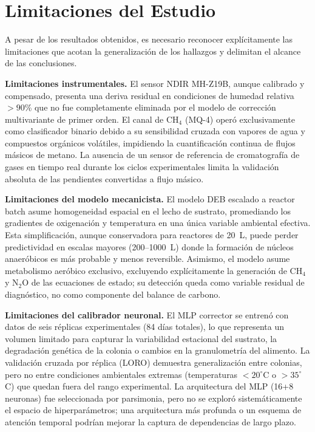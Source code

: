 \section{Limitaciones del Estudio}
\label{sec:cap6_limitaciones}

A pesar de los resultados obtenidos, es necesario reconocer explícitamente las limitaciones que acotan la generalización de los hallazgos y delimitan el alcance de las conclusiones.

\textbf{Limitaciones instrumentales.} El sensor NDIR MH-Z19B, aunque calibrado y compensado, presenta una deriva residual en condiciones de humedad relativa $> 90$\% que no fue completamente eliminada por el modelo de corrección multivariante de primer orden. El canal de CH$_4$ (MQ-4) operó exclusivamente como clasificador binario debido a su sensibilidad cruzada con vapores de agua y compuestos orgánicos volátiles, impidiendo la cuantificación continua de flujos másicos de metano. La ausencia de un sensor de referencia de cromatografía de gases en tiempo real durante los ciclos experimentales limita la validación absoluta de las pendientes convertidas a flujo másico.

\textbf{Limitaciones del modelo mecanicista.} El modelo DEB escalado a reactor batch asume homogeneidad espacial en el lecho de sustrato, promediando los gradientes de oxigenación y temperatura en una única variable ambiental efectiva. Esta simplificación, aunque conservadora para reactores de 20~L, puede perder predictividad en escalas mayores (200--1000~L) donde la formación de núcleos anaeróbicos es más probable y menos reversible. Asimismo, el modelo asume metabolismo aeróbico exclusivo, excluyendo explícitamente la generación de CH$_4$ y N$_2$O de las ecuaciones de estado; su detección queda como variable residual de diagnóstico, no como componente del balance de carbono.

\textbf{Limitaciones del calibrador neuronal.} El MLP corrector se entrenó con datos de seis réplicas experimentales (84 días totales), lo que representa un volumen limitado para capturar la variabilidad estacional del sustrato, la degradación genética de la colonia o cambios en la granulometría del alimento. La validación cruzada por réplica (LORO) demuestra generalización entre colonias, pero no entre condiciones ambientales extremas (temperaturas $< 20^\circ$C o $> 35^\circ$C) que quedan fuera del rango experimental. La arquitectura del MLP (16+8 neuronas) fue seleccionada por parsimonia, pero no se exploró sistemáticamente el espacio de hiperparámetros; una arquitectura más profunda o un esquema de atención temporal podrían mejorar la captura de dependencias de largo plazo.

